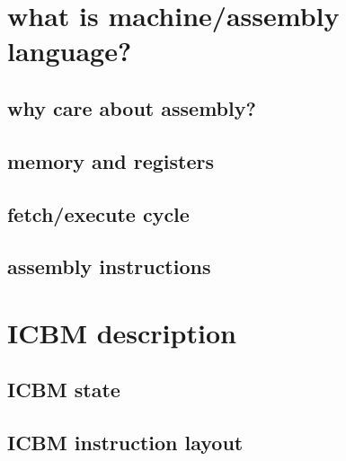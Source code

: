
\begin{frame}
    \titlepage
\end{frame}

\section{what is machine/assembly language?}



\subsection{why care about assembly?}



\subsection{memory and registers}



\subsection{fetch/execute cycle}



\subsection{assembly instructions}




\section{ICBM description}



\subsection{ICBM state}



\subsection{ICBM instruction layout}

